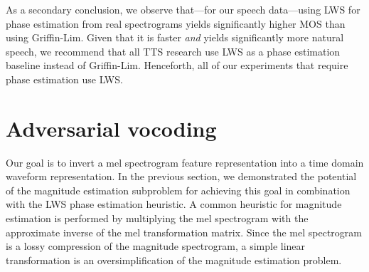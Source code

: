 \documentclass[a4paper]{article}
\begin{document}
As a secondary conclusion, we observe that---for our speech data---using LWS for phase estimation from real spectrograms yields significantly higher MOS than using Griffin-Lim. 
Given that it is faster \emph{and} yields significantly more natural speech, we recommend that all TTS research use LWS as a phase estimation baseline instead of Griffin-Lim. 
Henceforth, all of our experiments that require phase estimation use LWS.


\section{Adversarial vocoding}
\label{sec:methodology}
Our goal is to invert a mel spectrogram feature representation into a time domain waveform representation. 
In the previous section, we demonstrated the potential of the magnitude estimation subproblem for achieving this goal in combination with the LWS phase estimation heuristic. 
A common heuristic for magnitude estimation is performed by multiplying the mel spectrogram with the approximate inverse of the mel transformation matrix.
Since the mel spectrogram is a lossy compression of the magnitude spectrogram, a simple linear transformation is an oversimplification of the magnitude estimation problem.

\end{document}

